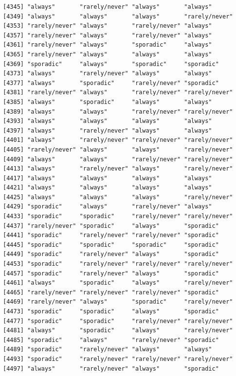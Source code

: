 \documentclass[
  letterpaper,
  DIV=11,
  numbers=noendperiod]{scrartcl}
\begin{document}
\begin{verbatim}
[4345] "always"       "rarely/never" "always"       "always"      
[4349] "always"       "always"       "always"       "rarely/never"
[4353] "rarely/never" "always"       "rarely/never" "always"      
[4357] "rarely/never" "always"       "rarely/never" "always"      
[4361] "rarely/never" "always"       "sporadic"     "always"      
[4365] "rarely/never" "always"       "always"       "always"      
[4369] "sporadic"     "always"       "sporadic"     "sporadic"    
[4373] "always"       "rarely/never" "always"       "always"      
[4377] "always"       "sporadic"     "rarely/never" "sporadic"    
[4381] "rarely/never" "always"       "rarely/never" "rarely/never"
[4385] "always"       "sporadic"     "always"       "always"      
[4389] "always"       "always"       "rarely/never" "rarely/never"
[4393] "always"       "always"       "always"       "always"      
[4397] "always"       "rarely/never" "always"       "always"      
[4401] "always"       "rarely/never" "rarely/never" "rarely/never"
[4405] "rarely/never" "always"       "always"       "rarely/never"
[4409] "always"       "always"       "rarely/never" "rarely/never"
[4413] "always"       "rarely/never" "always"       "rarely/never"
[4417] "always"       "always"       "always"       "always"      
[4421] "always"       "always"       "always"       "always"      
[4425] "always"       "always"       "always"       "rarely/never"
[4429] "sporadic"     "always"       "rarely/never" "always"      
[4433] "sporadic"     "sporadic"     "rarely/never" "rarely/never"
[4437] "rarely/never" "sporadic"     "always"       "sporadic"    
[4441] "sporadic"     "rarely/never" "rarely/never" "sporadic"    
[4445] "sporadic"     "sporadic"     "sporadic"     "sporadic"    
[4449] "sporadic"     "rarely/never" "always"       "sporadic"    
[4453] "sporadic"     "rarely/never" "rarely/never" "rarely/never"
[4457] "sporadic"     "rarely/never" "always"       "sporadic"    
[4461] "always"       "sporadic"     "always"       "rarely/never"
[4465] "rarely/never" "rarely/never" "rarely/never" "sporadic"    
[4469] "rarely/never" "always"       "sporadic"     "rarely/never"
[4473] "sporadic"     "sporadic"     "always"       "sporadic"    
[4477] "sporadic"     "sporadic"     "rarely/never" "rarely/never"
[4481] "always"       "sporadic"     "always"       "rarely/never"
[4485] "sporadic"     "always"       "rarely/never" "sporadic"    
[4489] "sporadic"     "rarely/never" "always"       "always"      
[4493] "sporadic"     "rarely/never" "rarely/never" "rarely/never"
[4497] "always"       "rarely/never" "always"       "sporadic"    

\end{verbatim}
\end{document}
